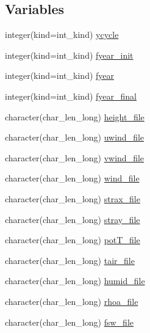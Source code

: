 \subsection*{Variables}
\begin{DoxyCompactItemize}
\item 
integer(kind=int\_\-kind) \hyperlink{namespaceice__forcing_a50c7cbc293e8bdff5e53f79b141e4a9b}{ycycle}
\item 
integer(kind=int\_\-kind) \hyperlink{namespaceice__forcing_a00220497cafa391e9105c65fad81c982}{fyear\_\-init}
\item 
integer(kind=int\_\-kind) \hyperlink{namespaceice__forcing_a9e840876f677642389293c4dda357eef}{fyear}
\item 
integer(kind=int\_\-kind) \hyperlink{namespaceice__forcing_aebf7ee5db66f4a38134d1314a4de3f8f}{fyear\_\-final}
\item 
character(char\_\-len\_\-long) \hyperlink{namespaceice__forcing_ab619dc21fc4da36e5f02a12ca1e7944d}{height\_\-file}
\item 
character(char\_\-len\_\-long) \hyperlink{namespaceice__forcing_a807421aa54b1f2f0416c158c1909b5bd}{uwind\_\-file}
\item 
character(char\_\-len\_\-long) \hyperlink{namespaceice__forcing_a81253ba2712f47539e7e4f1d0d35d885}{vwind\_\-file}
\item 
character(char\_\-len\_\-long) \hyperlink{namespaceice__forcing_a096f17ea955001c7c2f968e84e0bf5b5}{wind\_\-file}
\item 
character(char\_\-len\_\-long) \hyperlink{namespaceice__forcing_a49c9fbd4c57cb5e160f88fd18db10938}{strax\_\-file}
\item 
character(char\_\-len\_\-long) \hyperlink{namespaceice__forcing_a5539f8ddd2633d9b318092daf9745cf9}{stray\_\-file}
\item 
character(char\_\-len\_\-long) \hyperlink{namespaceice__forcing_aa081200ee80895fd9ca58398d4171467}{potT\_\-file}
\item 
character(char\_\-len\_\-long) \hyperlink{namespaceice__forcing_ab4ce88faae0d80e903bc827b71109573}{tair\_\-file}
\item 
character(char\_\-len\_\-long) \hyperlink{namespaceice__forcing_a2a98f60110b3268470cdb52f6b63486c}{humid\_\-file}
\item 
character(char\_\-len\_\-long) \hyperlink{namespaceice__forcing_a91b13032a46cf179bc526aaacf04608d}{rhoa\_\-file}
\item 
character(char\_\-len\_\-long) \hyperlink{namespaceice__forcing_ad4465d0f13c0141d16998d7771003a45}{fsw\_\-file}

\end{DoxyCompactItemize}
